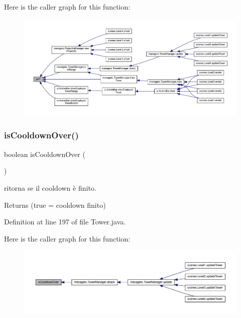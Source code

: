 Here is the caller graph for this function\+:\nopagebreak
\begin{figure}[H]
\begin{center}
\leavevmode
\includegraphics[width=350pt]{classtowers_1_1_tower_aab81944f0a14bba932c0931899951937_icgraph}
\end{center}
\end{figure}
\mbox{\label{classtowers_1_1_tower_a2c29881b5a93fb867aea578992af0db1}} 
\subsubsection{\texorpdfstring{is\+Cooldown\+Over()}{isCooldownOver()}}
{\footnotesize\ttfamily boolean is\+Cooldown\+Over (\begin{DoxyParamCaption}{ }\end{DoxyParamCaption})}



ritorna se il cooldown è finito. 

\begin{DoxyReturn}{Returns}
(true = cooldown finito) 
\end{DoxyReturn}


Definition at line 197 of file Tower.\+java.

Here is the caller graph for this function\+:\nopagebreak
\begin{figure}[H]
\begin{center}
\leavevmode
\includegraphics[width=350pt]{classtowers_1_1_tower_a2c29881b5a93fb867aea578992af0db1_icgraph}
\end{center}
\end{figure}
\mbox{\label{classtowers_1_1_tower_ac235927565a120a3157ef902721c105e}} 
